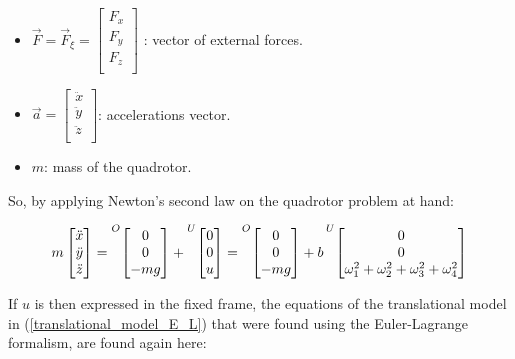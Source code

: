 \documentclass{thesisreport}
\begin{document}
\begin{itemize}
	\item $\overrightarrow{F}=\overrightarrow{F}_{\xi}=\begin{bmatrix}
F_x \\
F_y \\
F_z \\
\end{bmatrix}$ : vector of external forces.

\item $\overrightarrow{a} = \begin{bmatrix}
\ddot{x} \\
\ddot{y} \\
\ddot{z} \\
\end{bmatrix}$: accelerations vector.
\item $m$: mass of the quadrotor.
\end{itemize}

So, by applying Newton's second law on the quadrotor problem at hand:

\begin{equation*}
	m\begin{bmatrix}
	\ddot{x}\\
	\ddot{y}\\
	\ddot{z}\\
	\end{bmatrix} = \prescript{O}{}{\begin{bmatrix}
	0 \\
	0 \\
	-mg 
	\end{bmatrix}} + \prescript{U}{}{\begin{bmatrix}
	0 \\
	0 \\
	u 
	\end{bmatrix}} = \prescript{O}{}{\begin{bmatrix}
	0 \\
	0 \\
	-mg 
	\end{bmatrix}} + b \prescript{U}{}{\begin{bmatrix}
	0 \\
	0 \\
	\omega_1^2 + \omega_2^2 + \omega_3^2 + \omega_4^2
	\end{bmatrix}}
\end{equation*}


If $u$ is then expressed in the fixed frame, the equations of the translational model  in (\ref{translational_model_E_L}) that were found using the Euler-Lagrange formalism, are found again here:
\end{document}

